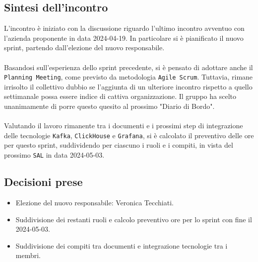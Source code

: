 \documentclass[8pt]{article}
\begin{document}
\subsection{Sintesi dell'incontro}
L'incontro è iniziato con la discussione riguardo l'ultimo incontro avventuo con l'azienda proponente in data 2024-04-19. In particolare si è pianificato il nuovo sprint, partendo dall'elezione del nuovo responsabile. \\~\\Basandosi sull'esperienza dello sprint precedente, si è pensato di adottare anche il \texttt{Planning Meeting}, come previsto da metodologia \texttt{Agile Scrum}. Tuttavia, rimane irrisolto il collettivo dubbio se l'aggiunta di un ulteriore incontro rispetto a quello settimanale possa essere indice di cattiva organizzazione. Il gruppo ha scelto unanimamente di porre questo quesito al prossimo "Diario di Bordo". \\~\\Valutando il lavoro rimanente tra i documenti e i prossimi step di integrazione delle tecnologie \texttt{Kafka}, \texttt{ClickHouse} e \texttt{Grafana}, si è calcolato il preventivo delle ore per questo sprint, suddividendo per ciascuno i ruoli e i compiti, in vista del prossimo \texttt{SAL} in data 2024-05-03.
\subsection{Decisioni prese}
\begin{itemize}
	\setlength\itemsep{0em}
	\item Elezione del nuovo responsabile: Veronica Tecchiati.
	\item Suddivisione dei restanti ruoli e calcolo preventivo ore per lo sprint con fine il 2024-05-03.
	\item Suddivisione dei compiti tra documenti e integrazione tecnologie tra i membri.
\end{itemize}
\newpage
\end{document}
